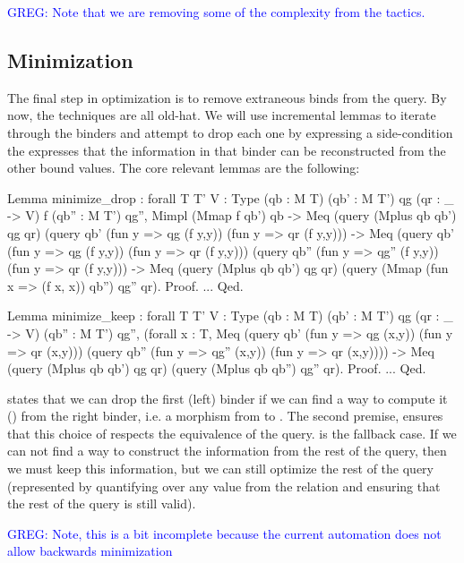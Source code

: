 \documentclass[preprint]{sigplanconf}
\newcommand{\greg}[1]{\textcolor{blue}{GREG: #1}}
\begin{document}
\greg{Note that we are removing some of the complexity from the tactics.}



\subsection{Minimization}

The final step in optimization is to remove extraneous binds from the query.
By now, the techniques are all old-hat.
We will use incremental lemmas to iterate through the binders and attempt to drop each one by expressing a side-condition the expresses that the information in that binder can be reconstructed from the other bound values.
The core relevant lemmas are the following:
\begin{coq}
Lemma minimize_drop
: forall {T T' V : Type} (qb : M T) (qb' : M T') qg (qr : _ -> V) f (qb'' : M T') qg'',
  Mimpl (Mmap f qb') qb ->
  Meq (query (Mplus qb qb') qg qr)
      (query qb' (fun y => qg (f y,y)) (fun y => qr (f y,y))) ->
  Meq (query qb' (fun y => qg (f y,y)) (fun y => qr (f y,y)))
      (query qb'' (fun y => qg'' (f y,y)) (fun y => qr (f y,y))) ->
  Meq (query (Mplus qb qb') qg qr)
      (query (Mmap (fun x => (f x, x)) qb'') qg'' qr).
Proof. ... Qed.

Lemma minimize_keep
: forall {T T' V : Type} (qb : M T) (qb' : M T') qg (qr : _ -> V) (qb'' : M T') qg'',
  (forall x : T,
     Meq (query qb' (fun y => qg (x,y)) (fun y => qr (x,y)))
         (query qb'' (fun y => qg'' (x,y)) (fun y => qr (x,y)))) ->
  Meq (query (Mplus qb qb') qg qr)
      (query (Mplus qb qb'') qg'' qr).
Proof. ... Qed.
\end{coq}
 states that we can drop the first (left) binder if we can find a way to compute it () from the right binder, i.e. a morphism from  to .
The second premise, ensures that this choice of  respects the equivalence of the query.
 is the fallback case.
If we can not find a way to construct the information from the rest of the query, then we must keep this information, but we can still optimize the rest of the query (represented by quantifying over any value from the relation and ensuring that the rest of the query is still valid).

\greg{Note, this is a bit incomplete because the current automation does not allow backwards minimization}
\end{document}
